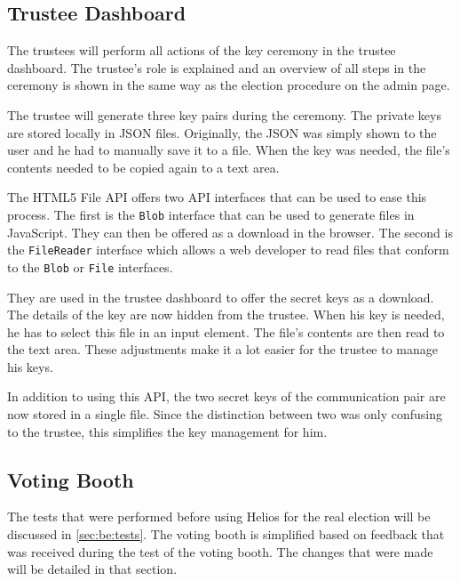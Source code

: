 \subsection{Trustee Dashboard}

The trustees will perform all actions of the key ceremony in the trustee dashboard. The trustee's role is explained and an overview of all steps in the ceremony is shown in the same way as the election procedure on the admin page.

\par The trustee will generate three key pairs during the ceremony. The private keys are stored locally in JSON files. Originally, the JSON was simply shown to the user and he had to manually save it to a file. When the key was needed, the file's contents needed to be copied again to a text area.

\par The HTML5 File API offers two API interfaces that can be used to ease this process.\cite{ranganathan_sicking_file_api} The first is the \texttt{Blob} interface that can be used to generate files in JavaScript. They can then be offered as a download in the browser. The second is the \texttt{FileReader} interface which allows a web developer to read files that conform to the \texttt{Blob} or \texttt{File} interfaces.

\par They are used in the trustee dashboard to offer the secret keys as a download. The details of the key are now hidden from the trustee. When his key is needed, he has to select this file in an input element. The file's contents are then read to the text area. These adjustments make it a lot easier for the trustee to manage his keys.

\par In addition to using this API, the two secret keys of the communication pair are now stored in a single file. Since the distinction between two was only confusing to the trustee, this simplifies the key management for him.

\subsection{Voting Booth}

The tests that were performed before using Helios for the real election will be discussed in \ref{sec:be:tests}. The voting booth is simplified based on feedback that was received during the test of the voting booth. The changes that were made will be detailed in that section.
